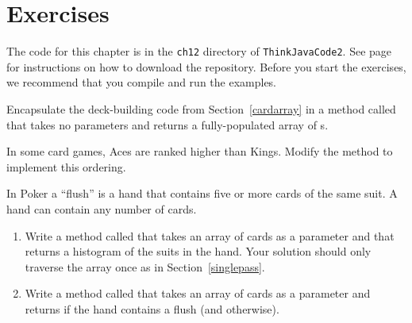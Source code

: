 \section{Exercises}

The code for this chapter is in the {\tt ch12} directory of {\tt ThinkJavaCode2}.
See page~\pageref{code} for instructions on how to download the repository.
Before you start the exercises, we recommend that you compile and run the examples.



\begin{exercise}  %

Encapsulate the deck-building code from Section~\ref{cardarray} in a method called  that takes no parameters and returns a fully-populated array of s.

\end{exercise}


\begin{exercise}  %

In some card games, Aces are ranked higher than Kings.
Modify the  method to implement this ordering.

\end{exercise}


\begin{exercise}  %

In Poker a ``flush'' is a hand that contains five or more cards of the same suit.
A hand can contain any number of cards.


\begin{enumerate}

\item Write a method called  that takes an array of cards as a parameter and that returns a histogram of the suits in the hand.
Your solution should only traverse the array once as in Section~\ref{singlepass}.

\item Write a method called  that takes an array of cards as a parameter and returns  if the hand contains a flush (and  otherwise).

\end{enumerate}

\end{exercise}


